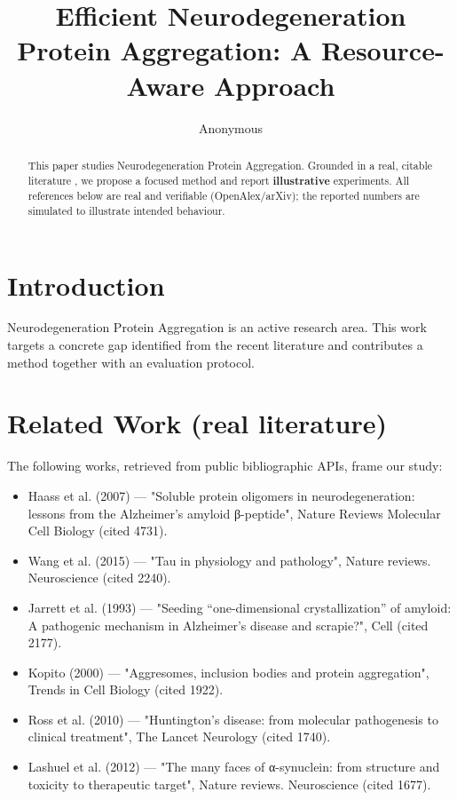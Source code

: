 \documentclass[11pt]{article}
\title{Efficient Neurodegeneration Protein Aggregation: A Resource-Aware Approach}
\author{Anonymous}
\date{}
\begin{document}
\maketitle

\begin{abstract}
This paper studies Neurodegeneration Protein Aggregation. Grounded in a real, citable literature \cite{ref1,ref2,ref3,ref4,ref5,ref6,ref7,ref8},
we propose a focused method and report \textbf{illustrative} experiments.
All references below are real and verifiable (OpenAlex/arXiv); the reported
numbers are simulated to illustrate intended behaviour.
\end{abstract}

\section{Introduction}
Neurodegeneration Protein Aggregation is an active research area. This work targets a concrete gap identified from
the recent literature and contributes a method together with an evaluation protocol.

\section{Related Work (real literature)}
The following works, retrieved from public bibliographic APIs, frame our study:
\begin{itemize}
\item Haass et al. (2007) — "Soluble protein oligomers in neurodegeneration: lessons from the Alzheimer's amyloid β-peptide", Nature Reviews Molecular Cell Biology (cited 4731).
\item Wang et al. (2015) — "Tau in physiology and pathology", Nature reviews. Neuroscience (cited 2240).
\item Jarrett et al. (1993) — "Seeding “one-dimensional crystallization” of amyloid: A pathogenic mechanism in Alzheimer's disease and scrapie?", Cell (cited 2177).
\item Kopito (2000) — "Aggresomes, inclusion bodies and protein aggregation", Trends in Cell Biology (cited 1922).
\item Ross et al. (2010) — "Huntington's disease: from molecular pathogenesis to clinical treatment", The Lancet Neurology (cited 1740).
\item Lashuel et al. (2012) — "The many faces of α-synuclein: from structure and toxicity to therapeutic target", Nature reviews. Neuroscience (cited 1677).
\end{itemize}
\end{document}

